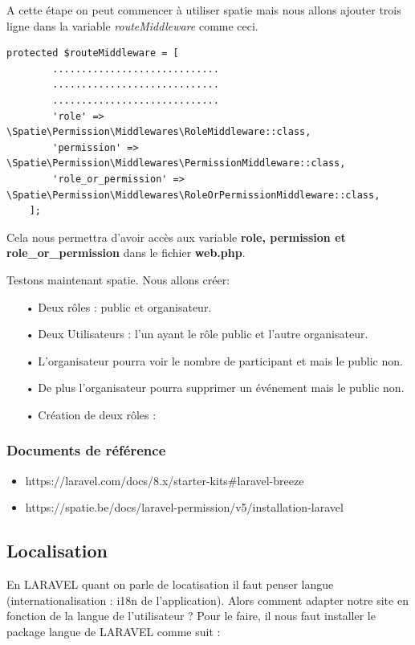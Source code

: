 \documentclass[12pt,a4paper]{article}
\begin{document}
A cette étape on peut commencer à utiliser spatie mais nous allons ajouter trois ligne 
dans la variable \textit{routeMiddleware} comme ceci.
\begin{verbatim}
protected $routeMiddleware = [
        .............................
        .............................
        .............................
        'role' => \Spatie\Permission\Middlewares\RoleMiddleware::class,
        'permission' => \Spatie\Permission\Middlewares\PermissionMiddleware::class,
        'role_or_permission' => \Spatie\Permission\Middlewares\RoleOrPermissionMiddleware::class,
    ];
\end{verbatim}

Cela nous permettra d'avoir accès aux variable \textbf{role, permission et role\_or\_permission} dans le fichier \textbf{web.php}.

Testons maintenant spatie. Nous allons créer:
\begin{itemize}
\item[•]  Deux rôles : public et organisateur.
\item[•]  Deux Utilisateurs : l'un ayant le rôle public et l'autre organisateur.
\item[•]  L'organisateur pourra voir le nombre de participant et mais le public non.
\item[•] De plus l'organisateur pourra supprimer un événement mais le public non.
\end{itemize}

\begin{itemize}
\item[•] Création de deux rôles :

\end{itemize}

\subsubsection{Documents de référence}
\begin{itemize}
\item https://laravel.com/docs/8.x/starter-kits\#laravel-breeze
\item https://spatie.be/docs/laravel-permission/v5/installation-laravel
\end{itemize}


\subsection{Localisation}
En LARAVEL quant on parle de locatisation il faut penser langue (internationalisation : i18n de l'application).
Alors comment adapter notre site en fonction de la langue de l'utilisateur ? Pour le faire, il nous 
faut installer le package langue de LARAVEL comme suit :
\end{document}
